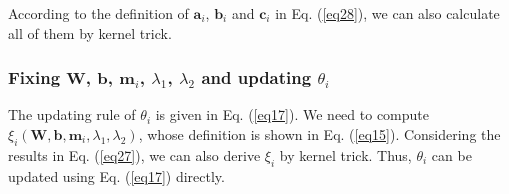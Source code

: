\documentclass[10pt,journal,compsoc]{IEEEtran}
\begin{document}
According to the definition of $\mathbf{a}_i$, $\mathbf{b}_i$ and $\mathbf{c}_i$ in Eq. (\ref{eq28}), we can also calculate all of them by kernel trick.

\subsubsection{Fixing $\mathbf{W}$, $\mathbf{b}$, $\mathbf{m}_i$, $\lambda_1$, $\lambda_2$ and updating $\theta_i$}

The updating rule of $\theta_i$ is given in Eq. (\ref{eq17}). We need to compute $\xi_i(\mathbf{W}, \mathbf{b}, \mathbf{m}_i, \lambda_1, \lambda_2)$, whose definition is shown in Eq. (\ref{eq15}). Considering the results in Eq. (\ref{eq27}), we can also derive $\xi_i$ by kernel trick. Thus, $\theta_i$ can be updated using Eq. (\ref{eq17}) directly.
\end{document}
